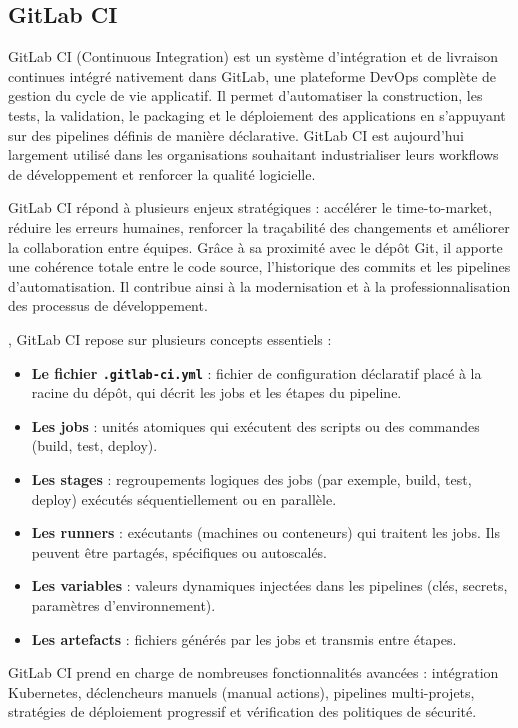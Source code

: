 \subsection{GitLab CI}

GitLab CI (Continuous Integration) est un système d’intégration et de livraison continues intégré nativement dans GitLab, une plateforme DevOps complète de gestion du cycle de vie applicatif. Il permet d’automatiser la construction, les tests, la validation, le packaging et le déploiement des applications en s’appuyant sur des pipelines définis de manière déclarative. GitLab CI est aujourd’hui largement utilisé dans les organisations souhaitant industrialiser leurs workflows de développement et renforcer la qualité logicielle.

GitLab CI répond à plusieurs enjeux stratégiques  : accélérer le time-to-market, réduire les erreurs humaines, renforcer la traçabilité des changements et améliorer la collaboration entre équipes. Grâce à sa proximité avec le dépôt Git, il apporte une cohérence totale entre le code source, l’historique des commits et les pipelines d’automatisation. Il contribue ainsi à la modernisation et à la professionnalisation des processus de développement.

, GitLab CI repose sur plusieurs concepts essentiels  :
\begin{itemize}
	\item \textbf{Le fichier \texttt{.gitlab-ci.yml}}  : fichier de configuration déclaratif placé à la racine du dépôt, qui décrit les jobs et les étapes du pipeline.
	\item \textbf{Les jobs}  : unités atomiques qui exécutent des scripts ou des commandes (build, test, deploy).
	\item \textbf{Les stages}  : regroupements logiques des jobs (par exemple, build, test, deploy) exécutés séquentiellement ou en parallèle.
	\item \textbf{Les runners}  : exécutants (machines ou conteneurs) qui traitent les jobs. Ils peuvent être partagés, spécifiques ou autoscalés.
	\item \textbf{Les variables}  : valeurs dynamiques injectées dans les pipelines (clés, secrets, paramètres d’environnement).
	\item \textbf{Les artefacts}  : fichiers générés par les jobs et transmis entre étapes.
\end{itemize}

GitLab CI prend en charge de nombreuses fonctionnalités avancées  : intégration Kubernetes, déclencheurs manuels (manual actions), pipelines multi-projets, stratégies de déploiement progressif et vérification des politiques de sécurité.

